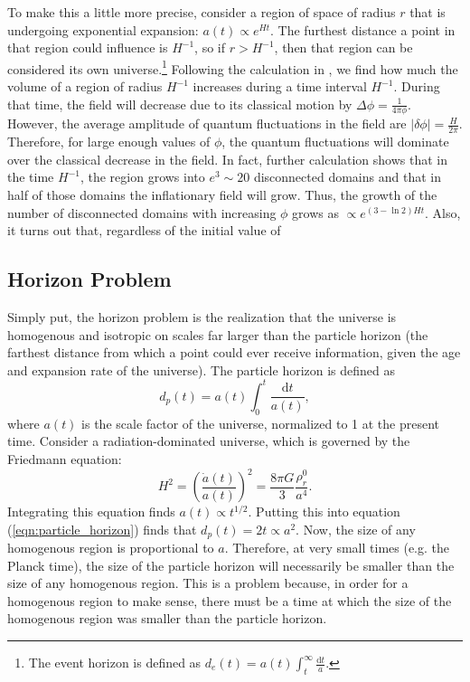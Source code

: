 \documentclass[a4paper,11pt]{article}
\def\d{\mathrm{d}}
\begin{document}
To make this a little more precise, consider a region of space of radius $r$ that is undergoing exponential expansion: $a(t) \propto e^{Ht}$. The furthest distance a point in that region could influence is $H^{-1}$, so if $r>H^{-1}$, then that region can be considered its own universe.\footnote{The event horizon is defined as $d_e(t) = a(t) \int^{\infty}_t \frac{\d t}{a}$.} Following the calculation in \citet{Linde+1994}, we find how much the volume of a region of radius $H^{-1}$ increases during a time interval $H^{-1}$. During that time, the field will decrease due to its classical motion by $\Delta \phi = \tfrac{1}{4\pi \phi}$. However, the average amplitude of quantum fluctuations in the field are $|\delta \phi| = \tfrac{H}{2\pi}$. Therefore, for large enough values of $\phi$, the quantum fluctuations will dominate over the classical decrease in the field. In fact, further calculation shows that in the time $H^{-1}$, the region grows into $e^3\sim20$ disconnected domains and that in half of those domains the inflationary field will grow. Thus, the growth of the number of disconnected domains with increasing $\phi$ grows as $\propto e^{(3-\ln2)Ht}$. Also, it turns out that, regardless of the initial value of 

\subsection{Horizon Problem}
\label{sec:horizon}
Simply put, the horizon problem is the realization that the universe is homogenous and isotropic on scales far larger than the particle horizon (the farthest distance from which a point could ever receive information, given the age and expansion rate of the universe). The particle horizon is defined as 
\begin{equation}
d_p(t) = a(t) \int_0^t \frac{\d t}{a(t)},
\label{eqn:particle_horizon}
\end{equation}
where $a(t)$ is the scale factor of the universe, normalized to 1 at the present time. Consider a radiation-dominated universe, which is governed by the Friedmann equation:
\begin{equation}
H^2 = \left ( \frac{\dot a(t)}{a(t)} \right ) ^2 = \frac{8 \pi G}{3} \frac{\rho^0_r}{a^4}.
\end{equation}
Integrating this equation finds $a(t) \propto t^{1/2}$. Putting this into equation (\ref{eqn:particle_horizon}) finds that $d_p(t) = 2t \propto a^2$. Now, the size of any homogenous region is proportional to $a$. Therefore, at very small times (e.g. the Planck time), the size of the particle horizon will necessarily be smaller than the size of any homogenous region. This is a problem because, in order for a homogenous region to make sense, there must be a time at which the size of the homogenous region was smaller than the particle horizon. 
\end{document}
